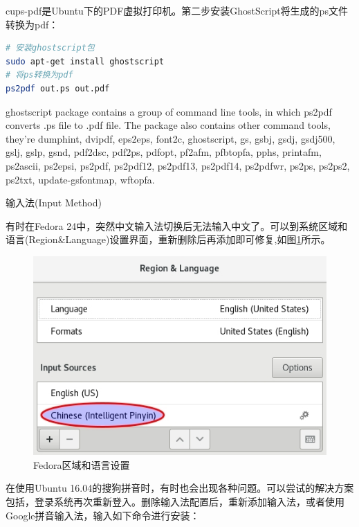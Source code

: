 \documentclass[12pt]{book}
\makeatletter
\numberwithin{dummy}{section}
\theoremstyle{ocrenumbox}
\theoremstyle{blacknumex}
\theoremstyle{blacknumbox}
\theoremstyle{ocrenum}
\renewcommand{\subsection}{\@startsection {subsection}{2}{\z@}
	{-3ex \@plus -0.1ex \@minus -.4ex}
	{0.5ex \@plus.2ex }
	{\normalfont\sffamily\bfseries}}
\makeatother
\begin{document}
cups-pdf是Ubuntu下的PDF虚拟打印机。第二步安装GhostScript将生成的ps文件转换为pdf：

\begin{lstlisting}[language=Bash]
# 安装ghostscript包
sudo apt-get install ghostscript
# 将ps转换为pdf
ps2pdf out.ps out.pdf
\end{lstlisting}

ghostscript package contains a group of command line tools, in which ps2pdf converts .ps file to .pdf file. The package also contains other command tools, they’re dumphint, dvipdf, eps2eps, font2c, ghostscript, gs, gsbj, gsdj, gsdj500, gslj, gslp, gsnd, pdf2dsc, pdf2ps, pdfopt, pf2afm, pfbtopfa, pphs, printafm, ps2ascii, ps2epsi, ps2pdf, ps2pdf12, ps2pdf13, ps2pdf14, ps2pdfwr, ps2ps, ps2ps2, ps2txt, update-gsfontmap, wftopfa.

\subsection{输入法(Input Method)}

有时在Fedora 24中，突然中文输入法切换后无法输入中文了。可以到系统区域和语言(Region\&Language)设置界面，重新删除后再添加即可修复,如图\ref{fig:regionandlanguagesetting}所示。

\begin{figure}[htbp]
	\centering
	\includegraphics[scale=0.6]{regionandlanguagesetting.jpg}
	\caption{Fedora区域和语言设置}
	\label{fig:regionandlanguagesetting}
\end{figure}

在使用Ubuntu 16.04的搜狗拼音时，有时也会出现各种问题。可以尝试的解决方案包括，登录系统再次重新登入。删除输入法配置后，重新添加输入法，或者使用Google拼音输入法，输入如下命令进行安装：
\end{document}
